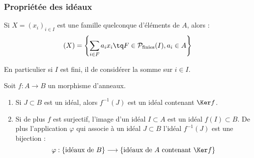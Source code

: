 \subsubsection{Propriétée des idéaux}
\vspace{0.5em}

\begin{prop}
 
Si $X=(x_i)_{i\in I}$ est une famille quelconque d'éléments de $A$, alors :
\begin{displaymath} (X) = \left\lbrace\sum_{i\in F} a_i x_i \tq F \in
\mathcal{P}_{\text{finies}}(I), a_i \in A\right\rbrace
\end{displaymath}

En particulier si $I$ est fini, il de considérer la somme sur $i\in I$.
\end{prop}

\begin{prop}

Soit $f : A \longrightarrow B$ un morphisme d'anneaux.
\begin{enumerate}
 \item Si $J\subset B$ est un idéal, alors $f^{-1}(J)$ est un idéal contenant
$\Ker f$.
 \item Si de plus $f$ est surjectif, l'image d'un idéal $I\subset A$ est un
idéal $f(I) \subset B$. De plus l'application $\varphi$ qui associe à un idéal
$J\subset B$ l'idéal $f^{-1}(J)$ est une bijection :
\begin{displaymath}
 \varphi : \{\text{idéaux de } B\} \longrightarrow \{\text{idéaux de }A\text{ 
contenant }\Ker f\}
\end{displaymath}
\end{enumerate}
\end{prop}

